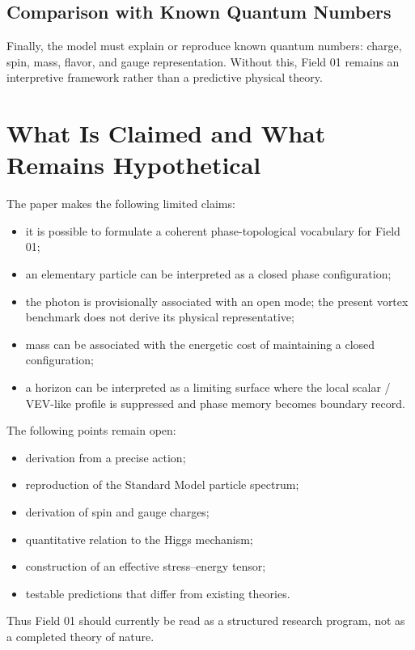 \documentclass[11pt,a4paper]{article}
\begin{document}
\subsection*{Comparison with Known Quantum Numbers}

Finally, the model must explain or reproduce known quantum numbers: charge, spin, mass, flavor, and gauge representation. Without this, Field 01 remains an interpretive framework rather than a predictive physical theory.

\section{What Is Claimed and What Remains Hypothetical}

The paper makes the following limited claims:
\begin{itemize}
\item it is possible to formulate a coherent phase-topological vocabulary for Field 01;
\item an elementary particle can be interpreted as a closed phase configuration;
\item the photon is provisionally associated with an open mode; the present vortex benchmark does not derive its physical representative;
\item mass can be associated with the energetic cost of maintaining a closed configuration;
\item a horizon can be interpreted as a limiting surface where the local scalar / VEV-like profile is suppressed and phase memory becomes boundary record.
\end{itemize}

The following points remain open:
\begin{itemize}
\item derivation from a precise action;
\item reproduction of the Standard Model particle spectrum;
\item derivation of spin and gauge charges;
\item quantitative relation to the Higgs mechanism;
\item construction of an effective stress--energy tensor;
\item testable predictions that differ from existing theories.
\end{itemize}

Thus Field 01 should currently be read as a structured research program, not as a completed theory of nature.
\end{document}
